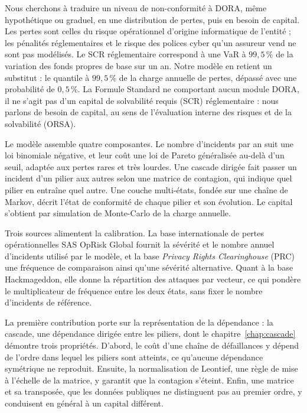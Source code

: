 Nous cherchons à traduire un niveau de non-conformité à DORA, même hypothétique ou graduel, en une
distribution de pertes, puis en besoin de capital. Les pertes sont celles du risque opérationnel
d'origine informatique de l'entité ; les pénalités réglementaires et le risque des polices cyber
qu'un assureur vend ne sont pas modélisés. Le SCR réglementaire correspond à une VaR à $99{,}5\,\%$ de la variation des fonds propres de base sur un an. Notre modèle en retient un substitut : le quantile à $99{,}5\,\%$ de la charge annuelle de pertes, dépassé avec une probabilité de $0{,}5\,\%$. La
Formule Standard ne comportant aucun module DORA, il ne s'agit pas d'un capital de solvabilité requis (SCR) réglementaire : nous parlons de besoin de capital, au sens de l'évaluation interne des risques et de la solvabilité
(ORSA).

Le modèle assemble quatre composantes. Le nombre d'incidents par an suit une loi binomiale négative, et
leur coût une loi de Pareto généralisée au-delà d'un seuil, adaptée aux pertes rares et très lourdes. Une
cascade dirigée fait passer un incident d'un pilier aux autres selon une matrice de contagion, qui indique
quel pilier en entraîne quel autre. Une couche multi-états, fondée sur une chaîne de Markov, décrit
l'état de conformité de chaque pilier et son évolution. Le capital s'obtient par simulation de Monte-Carlo
de la charge annuelle.

Trois sources alimentent la calibration. La base internationale de pertes opérationnelles SAS
OpRisk Global fournit la sévérité et le nombre annuel d'incidents utilisé par le modèle, et la base \emph{Privacy
Rights Clearinghouse} (PRC) une fréquence de comparaison ainsi qu'une sévérité alternative. Quant à la
base Hackmageddon, elle donne la répartition des attaques par vecteur, ce qui pondère le multiplicateur
de fréquence entre les deux états, sans fixer le nombre d'incidents de référence.

La première contribution porte sur la représentation de la dépendance : la cascade, une
dépendance dirigée entre les piliers, dont le chapitre~\ref{chap:cascade} démontre trois propriétés. D'abord, le
coût d'une chaîne de défaillances y dépend de l'ordre dans lequel les piliers sont atteints, ce qu'aucune dépendance
symétrique ne reproduit. Ensuite, la normalisation de Leontief, une règle de mise à l'échelle de la matrice, y garantit que la
contagion s'éteint. Enfin, une
matrice et sa transposée, que les données publiques ne distinguent pas au premier ordre, y conduisent
en général à un capital différent.

